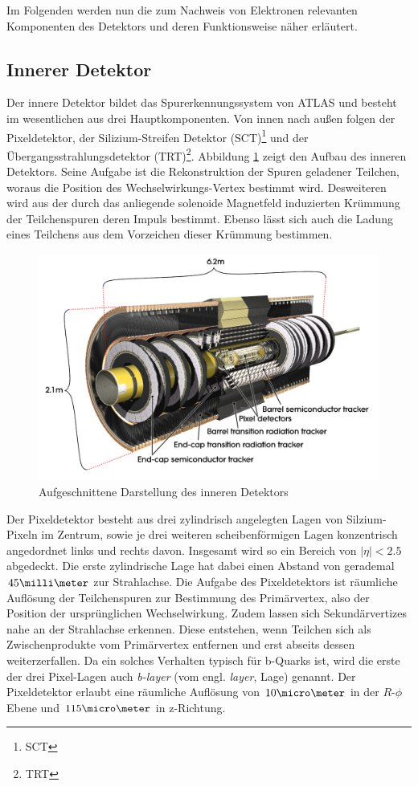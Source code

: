 Im Folgenden werden nun die zum Nachweis von Elektronen relevanten Komponenten
des Detektors und deren Funktionsweise näher erläutert.



\subsection{Innerer Detektor}
\label{inner_detector}

Der innere Detektor bildet das Spurerkennungssystem von ATLAS und besteht im
wesentlichen aus drei Hauptkomponenten. Von innen nach außen folgen der
Pixeldetektor, der Silizium-Streifen Detektor (\acs{SCT})\footnote{\acf{SCT}}
und der Übergangsstrahlungsdetektor (\acs{TRT})\footnote{\acf{TRT}}. Abbildung
\ref{fig:inner_detector} zeigt den Aufbau des inneren Detektors. Seine Aufgabe
ist die Rekonstruktion der Spuren geladener Teilchen, woraus die Position des
Wechselwirkungs-Vertex bestimmt wird. Desweiteren wird aus der durch das
anliegende solenoide Magnetfeld induzierten Krümmung der Teilchenspuren deren
Impuls bestimmt. Ebenso lässt sich auch die Ladung eines Teilchens aus dem
Vorzeichen dieser Krümmung bestimmen.

\begin{figure}
    \centering
    \includegraphics[width=.8\textwidth]{img/inner_detector}
    \caption[Darstellung des inneren Detektors]
        {Aufgeschnittene Darstellung des inneren Detektors}
    \label{fig:inner_detector}
\end{figure}

Der Pixeldetektor besteht aus drei zylindrisch angelegten Lagen von
Silzium-Pixeln im Zentrum, sowie je drei weiteren scheibenförmigen Lagen
konzentrisch angedordnet links und rechts davon. Insgesamt wird so ein Bereich
von $|\eta| < 2.5$ abgedeckt. Die erste zylindrische Lage hat dabei einen
Abstand von gerademal $45\milli\meter$ zur Strahlachse. Die Aufgabe des
Pixeldetektors ist räumliche Auflösung der Teilchenspuren zur Bestimmung des
Primärvertex, also der Position der ursprünglichen Wechselwirkung. Zudem lassen
sich Sekundärvertizes nahe an der Strahlachse erkennen. Diese entstehen, wenn
Teilchen sich als Zwischenprodukte vom Primärvertex entfernen und erst abseits
dessen weiterzerfallen. Da ein solches Verhalten typisch für b-Quarks ist, wird
die erste der drei Pixel-Lagen auch \textit{b-layer} (vom engl. \textit{layer},
Lage) genannt. Der Pixeldetektor erlaubt eine räumliche Auflösung von
$10\micro\meter$ in der $R$-$\phi$ Ebene und $115\micro\meter$ in z-Richtung.

